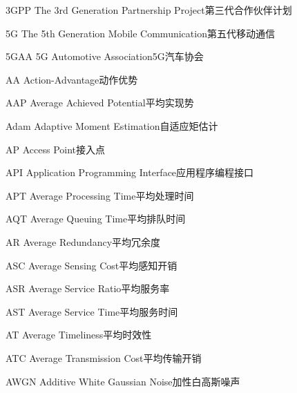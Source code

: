 
\begin{abbreviate}[0mm][18mm]
\item[3GPP] The 3rd Generation Partnership Project\hspace{1em}第三代合作伙伴计划
\item[5G] The 5th Generation Mobile Communication\hspace{1em}第五代移动通信
\item[5GAA] 5G Automotive Association\hspace{1em}5G汽车协会
\item[AA] Action-Advantage\hspace{1em}动作优势
\item[AAP] Average Achieved Potential\hspace{1em}平均实现势
\item[Adam] Adaptive Moment Estimation\hspace{1em}自适应矩估计
\item[AP] Access Point\hspace{1em}接入点
\item[API] Application Programming Interface\hspace{1em}应用程序编程接口
\item[APT] Average Processing Time\hspace{1em}平均处理时间
\item[AQT] Average Queuing Time\hspace{1em}平均排队时间
\item[AR] Average Redundancy\hspace{1em}平均冗余度
\item[ASC] Average Sensing Cost\hspace{1em}平均感知开销
\item[ASR] Average Service Ratio\hspace{1em}平均服务率
\item[AST] Average Service Time\hspace{1em}平均服务时间
\item[AT] Average Timeliness\hspace{1em}平均时效性
\item[ATC] Average Transmission Cost\hspace{1em}平均传输开销
\item[AWGN] Additive White Gaussian Noise\hspace{1em}加性白高斯噪声

\end{abbreviate}
